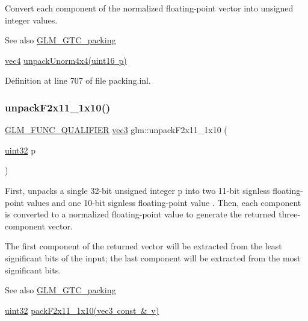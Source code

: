 Convert each component of the normalized floating-\/point vector into unsigned integer values.

\begin{DoxySeeAlso}{See also}
\mbox{\hyperlink{group__gtc__packing}{G\+L\+M\+\_\+\+G\+T\+C\+\_\+packing}} 

\mbox{\hyperlink{group__core__types_ga5881b1b022d7fd1b7218f5916532dd02}{vec4}} \mbox{\hyperlink{group__gtc__packing_ga38a0a518d53e15a9481c31dc1e574a40}{unpack\+Unorm4x4(uint16 p)}} 
\end{DoxySeeAlso}


Definition at line 707 of file packing.\+inl.

\mbox{\label{group__gtc__packing_ga8b9c7991eb021d95c778bf5c0b2f7824}} 
\subsubsection{\texorpdfstring{unpackF2x11\_1x10()}{unpackF2x11\_1x10()}}
{\footnotesize\ttfamily \mbox{\hyperlink{setup_8hpp_a33fdea6f91c5f834105f7415e2a64407}{G\+L\+M\+\_\+\+F\+U\+N\+C\+\_\+\+Q\+U\+A\+L\+I\+F\+I\+ER}} \mbox{\hyperlink{group__core__types_ga1c47e8b3386109bc992b6c48e91b0be7}{vec3}} glm\+::unpack\+F2x11\+\_\+1x10 (\begin{DoxyParamCaption}\item[{\mbox{\hyperlink{group__gtc__type__precision_ga202b6a53c105fcb7e531f9b443518451}{uint32}}}]{p }\end{DoxyParamCaption})}

First, unpacks a single 32-\/bit unsigned integer p into two 11-\/bit signless floating-\/point values and one 10-\/bit signless floating-\/point value . Then, each component is converted to a normalized floating-\/point value to generate the returned three-\/component vector.

The first component of the returned vector will be extracted from the least significant bits of the input; the last component will be extracted from the most significant bits.

\begin{DoxySeeAlso}{See also}
\mbox{\hyperlink{group__gtc__packing}{G\+L\+M\+\_\+\+G\+T\+C\+\_\+packing}} 

\mbox{\hyperlink{group__gtc__type__precision_ga202b6a53c105fcb7e531f9b443518451}{uint32}} \mbox{\hyperlink{group__gtc__packing_ga8c2a0eeee677ca4dafd9e093d9e81062}{pack\+F2x11\+\_\+1x10(vec3 const \& v)}} 
\end{DoxySeeAlso}


